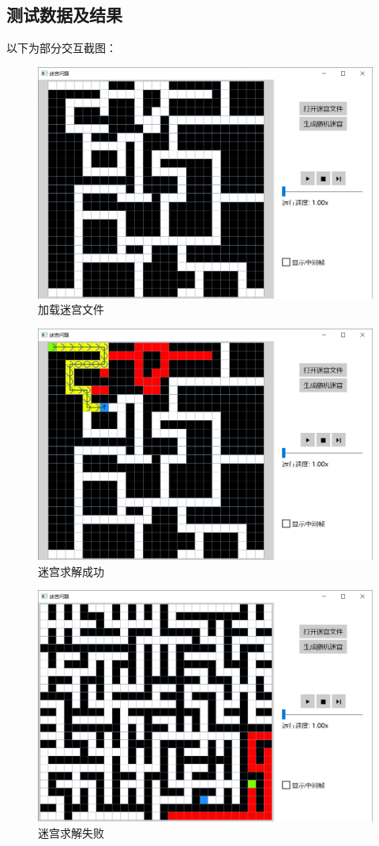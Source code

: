 \documentclass[a4paper,UTF8]{ctexart}
\begin{document}
\subsection{测试数据及结果}
以下为部分交互截图：
\begin{figure}[H]
\centering\includegraphics[width=\textwidth]{image04.png}\caption{加载迷宫文件}
\end{figure}
\begin{figure}[H]
\centering\includegraphics[width=\textwidth]{image05.png}\caption{迷宫求解成功}
\end{figure}
\begin{figure}[H]
\centering\includegraphics[width=\textwidth]{image06.png}\caption{迷宫求解失败}
\end{figure}
\end{document}
